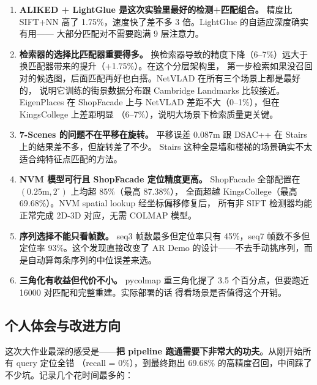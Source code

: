 \documentclass[12pt,a4paper]{ctexart}
\begin{document}
\begin{enumerate}
  \item \textbf{ALIKED + LightGlue 是这次实验里最好的检测+匹配组合。}
        精度比 SIFT+NN 高了 1.75\%，速度快了差不多 3 倍。LightGlue 的自适应深度确实有用——
        大部分匹配对不需要跑满 9 层注意力。

  \item \textbf{检索器的选择比匹配器重要得多。}
        换检索器导致的精度下降（6--7\%）远大于换匹配器带来的提升（+1.75\%）。在这个分层架构里，
        第一步检索如果没召回对的候选图，后面匹配再好也白搭。NetVLAD 在所有三个场景上都是最好的，
        说明它训练的街景数据分布跟 Cambridge Landmarks 比较接近。EigenPlaces 在
        ShopFacade 上与 NetVLAD 差距不大（0--1\%），但在 KingsCollege 上差距明显
        （6--7\%），说明大场景下检索质量更关键。

  \item \textbf{7-Scenes 的问题不在平移在旋转。}
        平移误差 0.087m 跟 DSAC++ 在 Stairs 上的结果差不多，但旋转差了不少。
        Stairs 这种全是墙和楼梯的场景确实不太适合纯特征点匹配的方法。

  \item \textbf{NVM 模型可行且 ShopFacade 定位精度更高。}
        ShopFacade 全部配置在 $(0.25\text{m},2^\circ)$ 上均超 85\%（最高 87.38\%），
        全面超越 KingsCollege（最高 69.68\%）。NVM spatial lookup 经坐标偏移修复后，
        所有非 SIFT 检测器均能正常完成 2D-3D 对应，无需 COLMAP 模型。

  \item \textbf{序列选择不能只看帧数。}
        seq3 帧数最多但定位率只有 45\%，seq7 帧数不多但定位率 93\%。这个发现直接改变了
        AR Demo 的设计——不去手动挑序列，而是自动算每条序列的中位误差来选。

  \item \textbf{三角化有收益但代价不小。}
        pycolmap 重三角化提了 3.5 个百分点，但要跑近 16000 对匹配和完整重建。实际部署的话
        得看场景是否值得这个开销。
\end{enumerate}

\subsection{个人体会与改进方向}

这次大作业最深的感受是——\textbf{把 pipeline 跑通需要下非常大的功夫}。从刚开始所有 query 定位全错
（recall = 0\%），到最终跑出 69.68\% 的高精度召回，中间踩了不少坑。记录几个花时间最多的：
\end{document}
